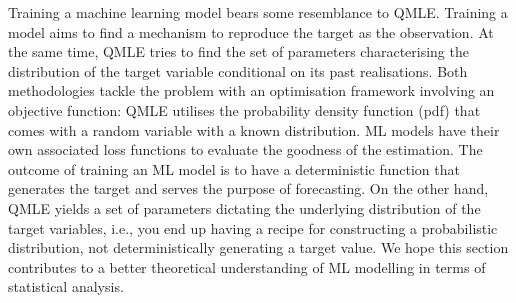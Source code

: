 Training a machine learning model bears some resemblance to QMLE. Training a model aims to find a mechanism to reproduce the target as the observation. At the same time, QMLE tries to find the set of parameters characterising the distribution of the target variable conditional on its past realisations. Both methodologies tackle the problem with an optimisation framework involving an objective function: QMLE utilises the probability density function (pdf) that comes with a random variable with a known distribution. ML models have their own associated loss functions to evaluate the goodness of the estimation. The outcome of training an ML model is to have a deterministic function that generates the target and serves the purpose of forecasting. On the other hand, QMLE yields a set of parameters dictating the underlying distribution of the target variables, i.e., you end up having a recipe for constructing a probabilistic distribution, not deterministically generating a target value. We hope this section contributes to a better theoretical understanding of ML modelling in terms of statistical analysis.

